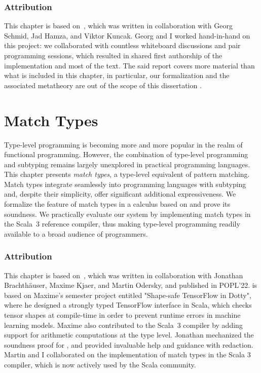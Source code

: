 \subsection*{Attribution}

This chapter is based on~\citep{schmid2020coming}, which was written in collaboration with Georg Schmid, Jad Hamza, and Viktor Kuncak.
Georg and I worked hand-in-hand on this project: we collaborated with countless whiteboard discussions and pair programming sessions, which resulted in shared first authorship of the implementation and most of the text.
The said report covers more material than what is included in this chapter, in particular, our formalization and the associated metatheory are out of the scope of this dissertation \citep[Section 3 and 4]{schmid2020coming}.



\chapter{Match Types}
\label{chap:match-types}

Type-level programming is becoming more and more popular in the realm of functional programming.
However, the combination of type-level programming and subtyping remains largely unexplored in practical programming languages.
This chapter presents \emph{match types}, a type-level equivalent of pattern matching.
Match types integrate seamlessly into programming languages with subtyping and, despite their simplicity, offer significant additional expressiveness.
We formalize the feature of match types in a calculus based on \SystemFsub and prove its soundness.
We practically evaluate our system by implementing match types in the Scala~3 reference compiler, thus making type-level programming readily available to a broad audience of programmers.

\subsection*{Attribution}

This chapter is based on~\citep{blanvillain2022type}, which was written in collaboration with Jonathan Brachthäuser, Maxime Kjaer, and Martin Odersky, and published in POPL'22.  is based on Maxime's semester project entitled "Shape-safe TensorFlow in Dotty", where he designed a strongly typed TensorFlow interface in Scala, which checks tensor shapes at compile-time in order to prevent runtime errors in machine learning models. Maxime also contributed to the Scala~3 compiler by adding support for arithmetic computations at the type level. Jonathan mechanized the soundness proof for \SystemFm, and provided invaluable help and guidance with redaction. Martin and I collaborated on the implementation of match types in the Scala 3 compiler, which is now actively used by the Scala community.


